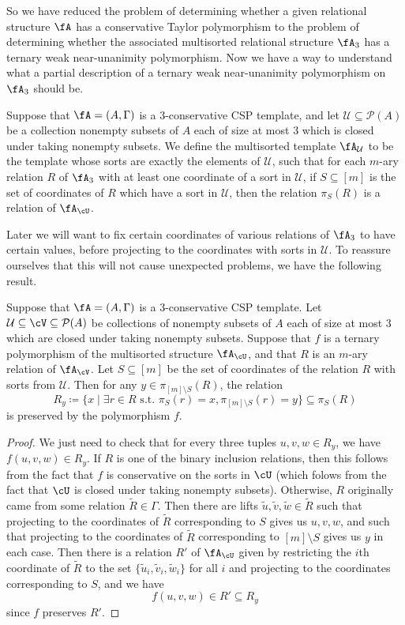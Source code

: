 So we have reduced the problem of determining whether a given relational structure $\fA$ has a conservative Taylor polymorphism to the problem of determining whether the associated multisorted relational structure $\fA_3$ has a ternary weak near-unanimity polymorphism. Now we have a way to understand what a partial description of a ternary weak near-unanimity polymorphism on $\fA_3$ should be.

\begin{defn} Suppose that $\fA = (A,\Gamma)$ is a $3$-conservative CSP template, and let $\mathcal{U} \subseteq \mathcal{P}(A)$ be a collection nonempty subsets of $A$ each of size at most $3$ which is closed under taking nonempty subsets. We define the multisorted template $\fA_\mathcal{U}$ to be the template whose sorts are exactly the elements of $\mathcal{U}$, such that for each $m$-ary relation $R$ of $\fA_3$ with at least one coordinate of a sort in $\mathcal{U}$, if $S \subseteq [m]$ is the set of coordinates of $R$ which have a sort in $\mathcal{U}$, then the relation $\pi_S(R)$ is a relation of $\fA_\cU$.
\end{defn}

Later we will want to fix certain coordinates of various relations of $\fA_3$ to have certain values, before projecting to the coordinates with sorts in $\mathcal{U}$. To reassure ourselves that this will not cause unexpected problems, we have the following result.

\begin{prop} Suppose that $\fA = (A,\Gamma)$ is a $3$-conservative CSP template. Let $\mathcal{U} \subseteq \cV \subseteq \mathcal{P}(A)$ be collections of nonempty subsets of $A$ each of size at most $3$ which are closed under taking nonempty subsets. Suppose that $f$ is a ternary polymorphism of the multisorted structure $\fA_\cU$, and that $R$ is an $m$-ary relation of $\fA_{\cV}$. Let $S \subseteq [m]$ be the set of coordinates of the relation $R$ with sorts from $\mathcal{U}$. Then for any $y \in \pi_{[m]\setminus S}(R)$, the relation
\[
R_y \coloneqq \{x \mid \exists r \in R\text{ s.t. }\pi_S(r) = x, \pi_{[m]\setminus S}(r) = y\} \subseteq \pi_S(R)
\]
is preserved by the polymorphism $f$.
\end{prop}
\begin{proof} We just need to check that for every three tuples $u,v,w \in R_y$, we have $f(u,v,w) \in R_y$. If $R$ is one of the binary inclusion relations, then this follows from the fact that $f$ is conservative on the sorts in $\cU$ (which folows from the fact that $\cU$ is closed under taking nonempty subsets). Otherwise, $R$ originally came from some relation $\tilde{R} \in \Gamma$. Then there are lifts $\tilde{u}, \tilde{v}, \tilde{w} \in \tilde{R}$ such that projecting to the coordinates of $\tilde{R}$ corresponding to $S$ gives us $u,v,w$, and such that projecting to the coordinates of $\tilde{R}$ corresponding to $[m]\setminus S$ gives us $y$ in each case. Then there is a relation $R'$ of $\fA_\cU$ given by restricting the $i$th coordinate of $\tilde{R}$ to the set $\{\tilde{u}_i, \tilde{v}_i, \tilde{w}_i\}$ for all $i$ and projecting to the coordinates corresponding to $S$, and we have
\[
f(u,v,w) \in R' \subseteq R_y
\]
since $f$ preserves $R'$.
\end{proof}

